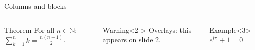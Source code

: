 \documentclass[aspectratio=169]{beamer}
\begin{document}
\begin{frame}{Columns and blocks}
\begin{columns}
\begin{block}{Theorem}
For all $n ∈ ℕ$: $\sum_{k=1}^n k = \frac{n(n+1)}{2}$.
\end{block}
\begin{alertblock}{Warning}<2->
Overlays: this appears on slide 2.
\end{alertblock}
\begin{exampleblock}{Example}<3>
$e^{iπ} + 1 = 0$
\end{exampleblock}
\end{columns}
\end{frame}
\end{document}
